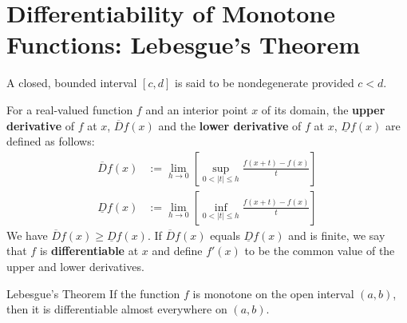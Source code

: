 \section{Differentiability of Monotone Functions: Lebesgue's Theorem}
A closed, bounded interval $[c,d]$ is said to be nondegenerate provided $c<d$.

For a real-valued function $f$ and an interior point $x$ of its domain, the \textbf{upper derivative} of $f$ at $x$, $\overline{D}f(x)$ and the \textbf{lower derivative} of $f$ at $x$, $\underline{D}f(x)$ are defined as follows:
\[
    \begin{split}
        \overline{D}f(x)&:=\lim_{h\to0}\left[\sup_{0<|t|\le h}\frac{f(x+t)-f(x)}{t}\right]\\
        \underline{D}f(x)&:=\lim_{h\to0}\left[\inf_{0<|t|\le h}\frac{f(x+t)-f(x)}{t}\right]
    \end{split}
\]
We have $\overline{D}f(x)\ge\underline{D}f(x)$.
If $\overline{D}f(x)$ equals $\underline{D}f(x)$ and is finite, we say that $f$ is \textbf{differentiable} at $x$ and define $f'(x)$ to be the common value of the upper and lower derivatives.

\begin{namedthm*}{Lebesgue's Theorem}
    If the function $f$ is monotone on the open interval $(a,b)$, then it is differentiable almost everywhere on $(a,b)$.
\end{namedthm*}

